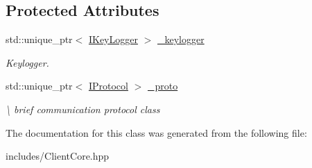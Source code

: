 \subsection*{Protected Attributes}
\begin{DoxyCompactItemize}
\item 
\mbox{\label{classspider_1_1_client_core_a43e5af78b702c6856b96275e684366ca}} 
std\+::unique\+\_\+ptr$<$ \hyperlink{class_i_key_logger}{I\+Key\+Logger} $>$ \hyperlink{classspider_1_1_client_core_a43e5af78b702c6856b96275e684366ca}{\+\_\+keylogger}
\begin{DoxyCompactList}\small\item\em Keylogger. \end{DoxyCompactList}\item 
\mbox{\label{classspider_1_1_client_core_af8ab6888457938369c77c0901697770b}} 
std\+::unique\+\_\+ptr$<$ \hyperlink{classspider_1_1_i_protocol}{I\+Protocol} $>$ \hyperlink{classspider_1_1_client_core_af8ab6888457938369c77c0901697770b}{\+\_\+proto}
\begin{DoxyCompactList}\small\item\em \textbackslash{} brief communication protocol class \end{DoxyCompactList}\end{DoxyCompactItemize}


The documentation for this class was generated from the following file\+:\begin{DoxyCompactItemize}
\item 
includes/Client\+Core.\+hpp\end{DoxyCompactItemize}
